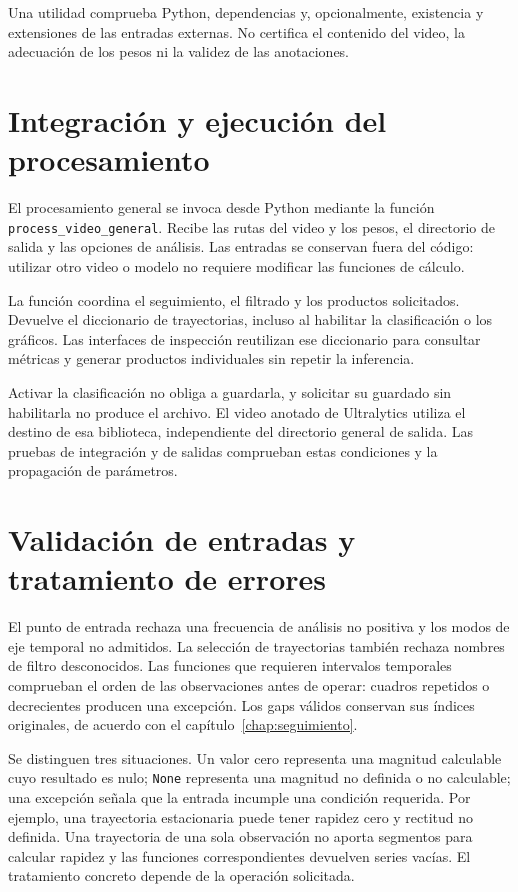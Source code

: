 Una utilidad comprueba Python, dependencias y, opcionalmente, existencia y extensiones de las entradas externas. No certifica el contenido del video, la adecuación de los pesos ni la validez de las anotaciones.

\section{Integración y ejecución del procesamiento}

El procesamiento general se invoca desde Python mediante la función \nolinkurl{process_video_general}. Recibe las rutas del video y los pesos, el directorio de salida y las opciones de análisis. Las entradas se conservan fuera del código: utilizar otro video o modelo no requiere modificar las funciones de cálculo.

La función coordina el seguimiento, el filtrado y los productos solicitados. Devuelve el diccionario de trayectorias, incluso al habilitar la clasificación o los gráficos. Las interfaces de inspección reutilizan ese diccionario para consultar métricas y generar productos individuales sin repetir la inferencia.

Activar la clasificación no obliga a guardarla, y solicitar su guardado sin habilitarla no produce el archivo. El video anotado de Ultralytics utiliza el destino de esa biblioteca, independiente del directorio general de salida. Las pruebas de integración y de salidas comprueban estas condiciones y la propagación de parámetros.

\section{Validación de entradas y tratamiento de errores}

El punto de entrada rechaza una frecuencia de análisis no positiva y los modos de eje temporal no admitidos. La selección de trayectorias también rechaza nombres de filtro desconocidos. Las funciones que requieren intervalos temporales comprueban el orden de las observaciones antes de operar: cuadros repetidos o decrecientes producen una excepción. Los gaps válidos conservan sus índices originales, de acuerdo con el capítulo~\ref{chap:seguimiento}.

Se distinguen tres situaciones. Un valor cero representa una magnitud calculable cuyo resultado es nulo; \texttt{None} representa una magnitud no definida o no calculable; una excepción señala que la entrada incumple una condición requerida. Por ejemplo, una trayectoria estacionaria puede tener rapidez cero y rectitud no definida. Una trayectoria de una sola observación no aporta segmentos para calcular rapidez y las funciones correspondientes devuelven series vacías. El tratamiento concreto depende de la operación solicitada.

